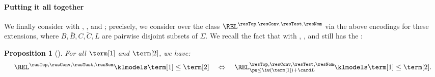 \documentclass[10pt,a4paper]{article}
\newtheorem{proposition}[theorem]{Proposition}
\theoremstyle{definition}
\theoremstyle{remark}
\newcommand{\vsig}{\Sigma}
\begin{document}
\paragraph*{Putting it all together}
We finally consider  with , , and ;
precisely, we consider  over the class
$\REL^{\resTop, \resConv, \resTest, \resNom}$ via the above encodings for these extensions,
where $B, \bar{B}, C, \breve{C}, L$ are pairwise disjoint subsets of $\vsig$.
We recall the fact that 
 with , , and 
still has the :
\begin{proposition}[{\cite[Proposition 6.5]{nakamuraDerivativesGraphsPositive2025}}]\label{proposition: ext bounded pw property}
    For all  $\term[1]$ and $\term[2]$,
    we have:
    \[\REL^{\resTop, \resConv, \resTest, \resNom} \klmodels \term[1] \le \term[2] \quad\Leftrightarrow\quad
    \REL^{\resTop, \resConv, \resTest, \resNom}_{\pw \le \iw(\term[1]) + \card L} \klmodels \term[1] \le \term[2].\]
\end{proposition}
\end{document}
